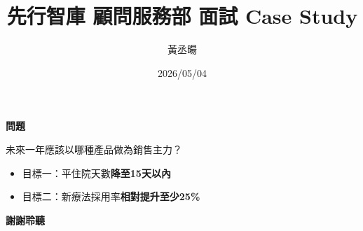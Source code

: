 \documentclass[aspectratio=169,12pt]{beamer}
\title{先行智庫 顧問服務部 面試 Case Study}
\author{黃丞暘}
\date{2026/05/04}
\begin{document}
\begin{frame}[t]{\textbf{問題}} 
    \setlength{\parskip}{2pt}
    {\Large
    \setlength{\baselineskip}{20pt}
    \parbox{\linewidth}{\raggedright 未來一年應該以哪種產品做為銷售主力？}}
    \begin{itemize}
        \item 目標一：平住院天數\textbf{降至15天以內}
        \item 目標二：新療法採用率\textbf{相對提升至少25\%}
    \end{itemize}
\end{frame}

\begin{frame}
    \centering\Huge{\textbf{謝謝聆聽}}
\end{frame}
\end{document}
